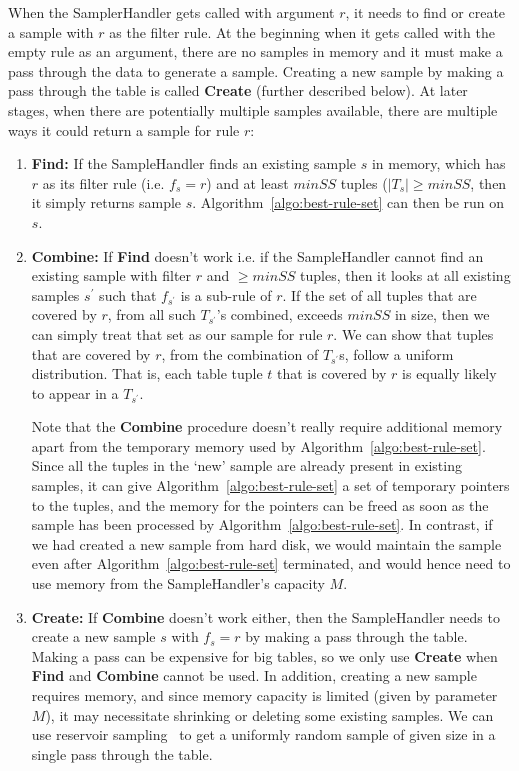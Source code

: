When the SamplerHandler gets called with argument $r$, it needs to find or create a sample with $r$ as the filter rule. At the beginning when it gets called with the empty rule as an argument, there are no samples in memory and it must make a pass through the data to generate a sample. Creating a new sample by making a pass through the table is called \textbf{Create} (further described below). At later stages, when there are potentially multiple samples available, there are multiple ways it could return a sample for rule $r$:
\begin{enumerate}
\item \textbf{Find:} If the SampleHandler finds an existing sample $s$ in memory, which has $r$ as its filter rule (i.e. $f_s = r$) and at least $minSS$ tuples ($|T_s| \geq minSS$, then it simply returns sample $s$. Algorithm~\ref{algo:best-rule-set} can then be run on $s$. 

\item \textbf{Combine:} If \textbf{Find} doesn't work i.e. if the SampleHandler cannot find an existing sample with filter $r$ and $\geq minSS$ tuples, then it looks at all existing samples $s^{\prime}$ such that $f_{s^{\prime}}$ is a sub-rule of $r$. If the set of all tuples that are covered by $r$, from all such $T_{s^{\prime}}$'s combined, exceeds $minSS$ in size, then we can simply treat that set as our sample for rule $r$.
We can show that tuples that are covered by $r$, from the combination of $T_{s^{\prime}}$s, follow a uniform distribution. That is, each table tuple $t$ that is covered by $r$ is equally likely to appear in a $T_{s^{\prime}}$. 

Note that the \textbf{Combine} procedure doesn't really require additional memory apart from the temporary memory used by Algorithm~\ref{algo:best-rule-set}. Since all the tuples in the `new' sample are already present in existing samples, it can give Algorithm~\ref{algo:best-rule-set} a set of temporary pointers to the tuples, and the memory for the pointers can be freed as soon as the sample has been processed by Algorithm~\ref{algo:best-rule-set}. In contrast, if we had created a new sample from hard disk, we would maintain the sample even after Algorithm~\ref{algo:best-rule-set} terminated, and would hence need to use memory from the SampleHandler's capacity $M$.

\item \textbf{Create:} If \textbf{Combine} doesn't work either, then the SampleHandler needs to create a new sample $s$ with $f_s = r$ by making a pass through the table. Making a pass can be expensive for big tables, so we only use \textbf{Create} when \textbf{Find} and \textbf{Combine} cannot be used. In addition, creating a new sample requires memory, and since memory capacity is limited (given by parameter $M$), it may necessitate shrinking or deleting some existing samples. 
We can use reservoir sampling~\cite{maibdr1983,Vitter:1985:RSR:3147.3165} to get a uniformly random sample of given size in a single pass through the table. 


\end{enumerate}
